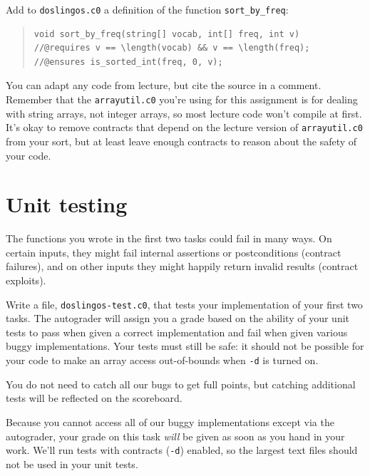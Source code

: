 \documentclass[12pt]{exam}
\begin{document}
\begin{task}[7]
Add to \lstinline'doslingos.c0' a definition of the function
\lstinline'sort_by_freq':
\begin{quote}
\begin{lstlisting}[numbers=none]
void sort_by_freq(string[] vocab, int[] freq, int v)
//@requires v == \length(vocab) && v == \length(freq);
//@ensures is_sorted_int(freq, 0, v);
\end{lstlisting}
\end{quote}
You can adapt any code from lecture, but cite the source in a
comment. Remember that the \lstinline'arrayutil.c0' you're using for this
assignment is for dealing with string arrays, not integer arrays, so
most lecture code won't compile at first. It's okay to remove
contracts that depend on the lecture version of \lstinline'arrayutil.c0'
from your sort, but at least leave enough contracts to reason about the
safety of your code.
\end{task}

\section{Unit testing}

The functions you wrote in the first two tasks could fail in many
ways. On certain inputs, they might fail internal assertions or
postconditions (contract failures), and on other inputs they might
happily return invalid results (contract exploits).

\begin{task}[8]
Write a file, \lstinline'doslingos-test.c0', that tests your
implementation of your first two tasks.  The autograder will assign
you a grade based on the ability of your unit tests to pass when
given a correct implementation and fail when given various buggy
implementations.  Your tests must still be safe: it should not be
possible for your code to make an array access out-of-bounds when
\lstinline'-d' is turned on.

You do not need to catch all our bugs to get full points, but
catching additional tests will be reflected on the scoreboard.
\end{task}

Because you cannot access all of our buggy implementations except via
the autograder, your grade on this task \emph{will} be given as soon
as you hand in your work.
We'll run tests with contracts (\lstinline'-d') enabled, so the largest
text files should not be used in your unit tests.
\end{document}
